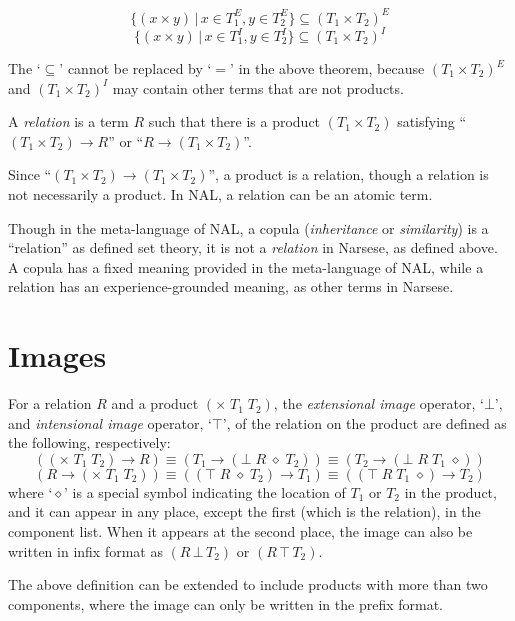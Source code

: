 \begin{theo}
\[\{(x \times y) \, | \, x \in T_1^E, y \in T_2^E\} \subseteq
(T_1 \times T_2)^E\]
\[\{(x \times y) \, | \, x \in T_1^I, y \in T_2^I\} \subseteq
(T_1 \times T_2)^I\]
\end{theo}
The `$\subseteq$' cannot be replaced by `$=$' in the above theorem, because $(T_1 \times T_2)^E$ and $(T_1 \times T_2)^I$ may contain other terms that are not products.

\begin{defi}
A {\em relation} is a term $R$ such that there is a product $(T_1 \times T_2)$ satisfying ``\((T_1 \times T_2) \rightarrow R\)'' or ``\(R \rightarrow (T_1 \times T_2)\)''.
\end{defi}
Since ``\((T_1 \times T_2) \rightarrow (T_1 \times T_2)\)'', a product is a relation, though a relation is not necessarily a product. In NAL, a relation can be an atomic term.

Though in the meta-language of NAL, a copula (\emph{inheritance} or \emph{similarity}) is a ``relation'' as defined set theory, it is not a \emph{relation} in Narsese, as defined above. A copula has a fixed meaning provided in the meta-language of NAL, while a relation has an experience-grounded meaning, as other terms in Narsese.


\section{Images}

\begin{defi}
For a relation $R$ and a product $(\times \; T_1 \; T_2)$, the {\em extensional image} operator, `$\bot$', and {\em intensional image} operator, `$\top$', of the relation on the product are defined as the following, respectively:
\[((\times \; T_1 \; T_2) \rightarrow R) \equiv
    (T_1 \rightarrow (\bot \; R \; \diamond \; T_2)) \equiv
    (T_2 \rightarrow (\bot \; R \; T_1 \; \diamond))\]
\[(R \rightarrow (\times \; T_1 \; T_2)) \equiv
    ((\top \; R \; \diamond \; T_2) \rightarrow T_1) \equiv
    ((\top \; R \; T_1 \; \diamond) \rightarrow T_2)\]
where `$\diamond$' is a special symbol indicating the location of $T_1$ or $T_2$ in the product, and it can appear in any place, except the first (which is the relation), in the component list.  When it appears at the second place, the image can also be written in infix format as \((R \, \bot \, T_2)\) or \((R \, \top \, T_2)\).
\end{defi}

The above definition can be extended to include products with more than two components, where the image can only be written in the prefix format.

